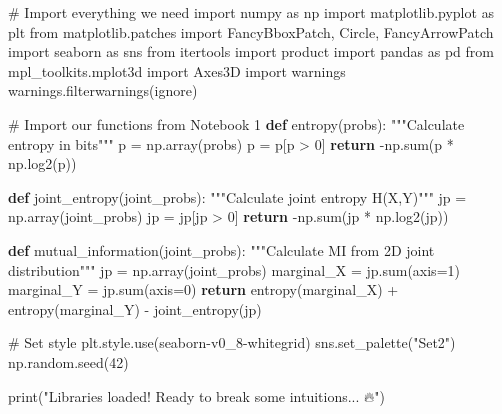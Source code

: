 \documentclass[
  11pt,
  letterpaper,
  oneside,
  openany]{book}
\newenvironment{Shaded}{\begin{snugshade}}{\end{snugshade}}
\newcommand{\BuiltInTok}[1]{\textcolor[rgb]{0.00,0.23,0.31}{#1}}
\newcommand{\CommentTok}[1]{\textcolor[rgb]{0.37,0.37,0.37}{#1}}
\newcommand{\ControlFlowTok}[1]{\textcolor[rgb]{0.00,0.23,0.31}{\textbf{#1}}}
\newcommand{\DecValTok}[1]{\textcolor[rgb]{0.68,0.00,0.00}{#1}}
\newcommand{\ImportTok}[1]{\textcolor[rgb]{0.00,0.46,0.62}{#1}}
\newcommand{\KeywordTok}[1]{\textcolor[rgb]{0.00,0.23,0.31}{\textbf{#1}}}
\newcommand{\NormalTok}[1]{\textcolor[rgb]{0.00,0.23,0.31}{#1}}
\newcommand{\OperatorTok}[1]{\textcolor[rgb]{0.37,0.37,0.37}{#1}}
\newcommand{\StringTok}[1]{\textcolor[rgb]{0.13,0.47,0.30}{#1}}
\begin{document}
\begin{Shaded}
\begin{Highlighting}[]
\CommentTok{\# Import everything we need}
\ImportTok{import}\NormalTok{ numpy }\ImportTok{as}\NormalTok{ np}
\ImportTok{import}\NormalTok{ matplotlib.pyplot }\ImportTok{as}\NormalTok{ plt}
\ImportTok{from}\NormalTok{ matplotlib.patches }\ImportTok{import}\NormalTok{ FancyBboxPatch, Circle, FancyArrowPatch}
\ImportTok{import}\NormalTok{ seaborn }\ImportTok{as}\NormalTok{ sns}
\ImportTok{from}\NormalTok{ itertools }\ImportTok{import}\NormalTok{ product}
\ImportTok{import}\NormalTok{ pandas }\ImportTok{as}\NormalTok{ pd}
\ImportTok{from}\NormalTok{ mpl\_toolkits.mplot3d }\ImportTok{import}\NormalTok{ Axes3D}
\ImportTok{import}\NormalTok{ warnings}
\NormalTok{warnings.filterwarnings(}\StringTok{\textquotesingle{}ignore\textquotesingle{}}\NormalTok{)}

\CommentTok{\# Import our functions from Notebook 1}
\KeywordTok{def}\NormalTok{ entropy(probs):}
    \CommentTok{"""Calculate entropy in bits"""}
\NormalTok{    p }\OperatorTok{=}\NormalTok{ np.array(probs)}
\NormalTok{    p }\OperatorTok{=}\NormalTok{ p[p }\OperatorTok{\textgreater{}} \DecValTok{0}\NormalTok{]}
    \ControlFlowTok{return} \OperatorTok{{-}}\NormalTok{np.}\BuiltInTok{sum}\NormalTok{(p }\OperatorTok{*}\NormalTok{ np.log2(p))}

\KeywordTok{def}\NormalTok{ joint\_entropy(joint\_probs):}
    \CommentTok{"""Calculate joint entropy H(X,Y)"""}
\NormalTok{    jp }\OperatorTok{=}\NormalTok{ np.array(joint\_probs)}
\NormalTok{    jp }\OperatorTok{=}\NormalTok{ jp[jp }\OperatorTok{\textgreater{}} \DecValTok{0}\NormalTok{]}
    \ControlFlowTok{return} \OperatorTok{{-}}\NormalTok{np.}\BuiltInTok{sum}\NormalTok{(jp }\OperatorTok{*}\NormalTok{ np.log2(jp))}

\KeywordTok{def}\NormalTok{ mutual\_information(joint\_probs):}
    \CommentTok{"""Calculate MI from 2D joint distribution"""}
\NormalTok{    jp }\OperatorTok{=}\NormalTok{ np.array(joint\_probs)}
\NormalTok{    marginal\_X }\OperatorTok{=}\NormalTok{ jp.}\BuiltInTok{sum}\NormalTok{(axis}\OperatorTok{=}\DecValTok{1}\NormalTok{)}
\NormalTok{    marginal\_Y }\OperatorTok{=}\NormalTok{ jp.}\BuiltInTok{sum}\NormalTok{(axis}\OperatorTok{=}\DecValTok{0}\NormalTok{)}
    \ControlFlowTok{return}\NormalTok{ entropy(marginal\_X) }\OperatorTok{+}\NormalTok{ entropy(marginal\_Y) }\OperatorTok{{-}}\NormalTok{ joint\_entropy(jp)}

\CommentTok{\# Set style}
\NormalTok{plt.style.use(}\StringTok{\textquotesingle{}seaborn{-}v0\_8{-}whitegrid\textquotesingle{}}\NormalTok{)}
\NormalTok{sns.set\_palette(}\StringTok{"Set2"}\NormalTok{)}
\NormalTok{np.random.seed(}\DecValTok{42}\NormalTok{)}

\BuiltInTok{print}\NormalTok{(}\StringTok{"Libraries loaded! Ready to break some intuitions... 🔥"}\NormalTok{)}
\end{Highlighting}
\end{Shaded}
\end{document}

